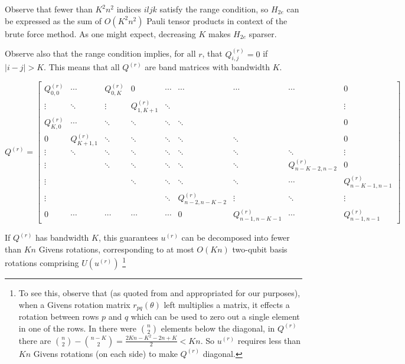 Observe that fewer than $K^2n^2$ indices $iljk$ satisfy the range condition, so $H_{2e}$ can be expressed as the sum of $O(K^2n^2)$ Pauli tensor products in context of the brute force method. As one might expect, decreasing $K$ makes $H_{2e}$ sparser.

Observe also that the range condition implies, for all $r$, that $Q^{(r)}_{i, j} = 0$ if $|i - j| > K$. This means that all $Q^{(r)}$ are band matrices with bandwidth $K$.

\begin{equation}
    Q^{(r)} = \begin{bmatrix}
        Q^{(r)}_{0, 0} & \cdots & Q^{(r)}_{0, K} & 0 & \cdots & \cdots & \cdots & \cdots & 0 \\
        \vdots & \ddots & \vdots & Q^{(r)}_{1, K + 1} & \ddots & & & & \vdots \\
        Q^{(r)}_{K, 0} & \cdots & \ddots & \ddots & \ddots & \ddots & & & 0 \\
        0 & Q^{(r)}_{K + 1, 1} & \ddots & \ddots & \ddots & \ddots & \ddots & & 0 \\
        \vdots & \ddots & \ddots & \ddots & \ddots & \ddots & \ddots & \ddots & \vdots \\
        \vdots & & \ddots & \ddots & \ddots & \ddots & \ddots & Q^{(r)}_{n - K - 2, n - 2} & 0 \\
        \vdots & & & \ddots & \ddots & \ddots & \ddots & \cdots & Q^{(r)}_{n - K - 1, n - 1} \\
        \vdots & & & & \ddots & Q^{(r)}_{n - 2, n - K - 2} & \vdots & \ddots & \vdots \\
        0 & \cdots & \cdots & \cdots & \cdots & 0 & Q^{(r)}_{n - 1, n - K - 1} & \cdots & Q^{(r)}_{n - 1, n - 1}
    \end{bmatrix}
\end{equation}

If $Q^{(r)}$ has bandwidth $K$, this guarantees $u^{(r)}$ can be decomposed into fewer than $Kn$ Givens rotations, corresponding to at most $O(Kn)$ two-qubit basis rotations comprising $U(u^{(r)})$ \footnote{To see this, observe that (as quoted from \cite{FSN} and appropriated for our purposes), when a Givens rotation matrix $r_{pq}(\theta)$ left multiplies a matrix, it effects a rotation between rows $p$ and $q$ which can be used to zero out a single element in one of the rows. In \cite{FSN} there were ${n \choose 2}$ elements below the diagonal, in $Q^{(r)}$ there are ${n \choose 2} - {n - K \choose 2} = \frac{2Kn - K^2 - 2n + K}{2}< Kn$. So $u^{(r)}$ requires less than $Kn$ Givens rotations (on each side) to make $Q^{(r)}$ diagonal.}

